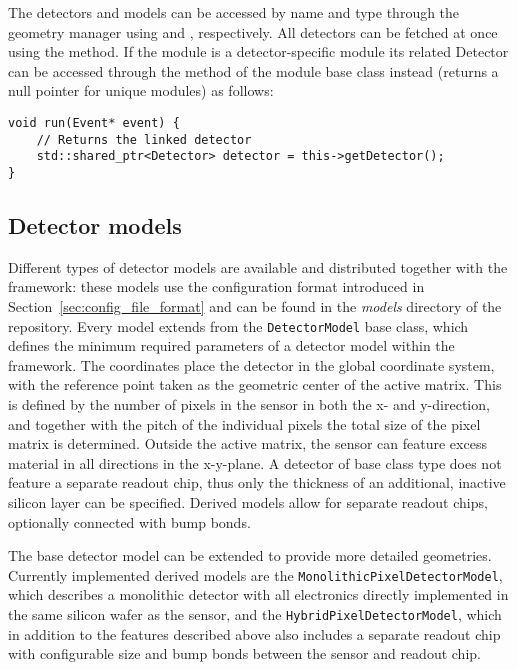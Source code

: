 The detectors and models can be accessed by name and type through the geometry manager using  and , respectively.
All detectors can be fetched at once using the  method.
If the module is a detector-specific module its related Detector can be accessed through the  method of the module base class instead (returns a null pointer for unique modules) as follows:
\begin{verbatim}
void run(Event* event) {
    // Returns the linked detector
    std::shared_ptr<Detector> detector = this->getDetector();
}
\end{verbatim}

\subsection{Detector models}
\label{sec:detector_models}
Different types of detector models are available and distributed together with the framework: these models use the configuration format introduced in Section~\ref{sec:config_file_format} and can be found in the \textit{models} directory of the repository.
Every model extends from the \texttt{DetectorModel} base class, which defines the minimum required parameters of a detector model within the framework.
The coordinates place the detector in the global coordinate system, with the reference point taken as the geometric center of the active matrix.
This is defined by the number of pixels in the sensor in both the x- and y-direction, and together with the pitch of the individual pixels the total size of the pixel matrix is determined.
Outside the active matrix, the sensor can feature excess material in all directions in the x-y-plane.
A detector of base class type does not feature a separate readout chip, thus only the thickness of an additional, inactive silicon layer can be specified.
Derived models allow for separate readout chips, optionally connected with bump bonds.

The base detector model can be extended to provide more detailed geometries.
Currently implemented derived models are the \texttt{MonolithicPixelDetectorModel}, which describes a monolithic detector with all electronics directly implemented in the same silicon wafer as the sensor, and the \texttt{HybridPixelDetectorModel}, which in addition to the features described above also includes a separate readout chip with configurable size and bump bonds between the sensor and readout chip.

